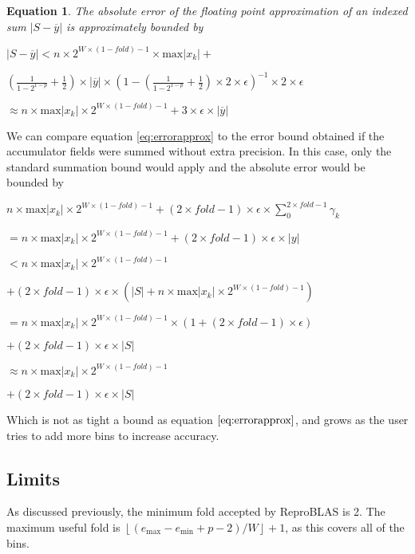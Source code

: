 \documentclass[12pt]{article}
\providecommand{\floor}[1]{\left \lfloor #1 \right \rfloor }
\providecommand{\min}{\ensuremath{\text{min}}}
\providecommand{\max}{\ensuremath{\text{max}}}
\theoremstyle{plain}
\newtheorem{eq}{Equation}[section]
\begin{document}
    \begin{eq} The absolute error of the floating point approximation of an indexed sum $|S - \overline{y}|$ is approximately bounded by

      $|S - \overline{y}| < n \times 2^{W \times (1 - fold) - 1} \times \max|x_k| + $

      \indent \indent$(\frac{1}{1 - 2^{1 - p}} + \frac{1}{2})\times|\overline{y}|\times (1 - (\frac{1}{1 - 2^{1 - p}} + \frac{1}{2})\times 2 \times \epsilon)^{-1} \times 2 \times \epsilon$

      \indent\indent$\approx n \times \max|x_k|\times 2^{W \times (1 - fold) - 1} + 3 \times \epsilon \times |\overline{y}|$
      \label{eq:error2approx}
    \end{eq}

    We can compare equation \ref{eq:errorapprox} to the error bound obtained if the accumulator fields were summed without extra precision. In this case, only the standard summation bound would apply and the absolute error would be bounded by

    $n \times \max|x_k|\times 2^{W \times (1 - fold) - 1} + (2 \times fold - 1) \times \epsilon \times \sum\limits_0^{2 \times fold - 1}\gamma_k$

    \indent\indent $= n \times \max|x_k|\times 2^{W \times (1 - fold) - 1} + (2 \times fold - 1) \times \epsilon \times |y|$

    \indent\indent$< n \times \max|x_k|\times 2^{W \times (1 - fold) - 1}$

    \indent\indent\indent$ + (2 \times fold - 1) \times \epsilon \times (|S| + n \times \max|x_k|\times 2^{W \times (1 - fold) - 1})$

    \indent\indent$= n \times \max|x_k|\times 2^{W \times (1 - fold) - 1}\times (1 + (2 \times fold - 1)\times \epsilon)$

    \indent\indent\indent$ + (2 \times fold - 1) \times \epsilon \times |S|$

    \indent\indent$\approx n \times \max|x_k|\times 2^{W \times (1 - fold) - 1}$

    \indent\indent\indent$ + (2 \times fold - 1) \times \epsilon \times |S|$

    Which is not as tight a bound as equation $\ref{eq:errorapprox}$, and grows as the user tries to add more bins to increase accuracy.
  \subsection{Limits}
    \label{sec:limits}
    As discussed previously, the minimum fold accepted by ReproBLAS is 2. The maximum useful fold is $\floor{(e_{\max} - e_{\min} + p - 2)/W} + 1$, as this covers all of the bins.
\end{document}
